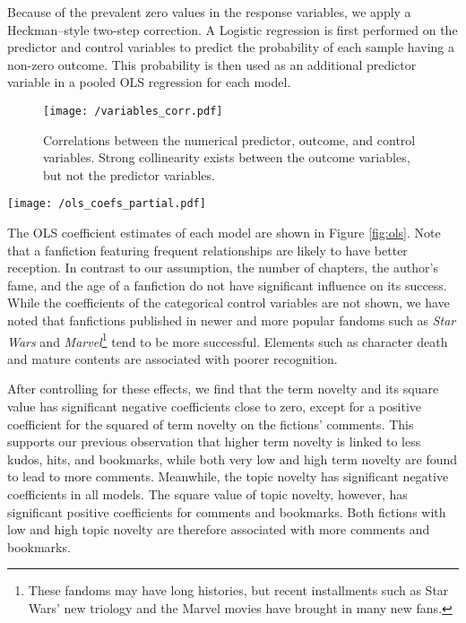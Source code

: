 \documentclass[letterpaper]{article} %
\begin{document}
Because of the prevalent zero values in the response variables, we apply a Heckman--style two-step correction. A Logistic regression is first performed on the predictor and control variables to predict the probability of each sample having a non-zero outcome. This probability is then used as an additional predictor variable in a pooled OLS regression for each model.

\begin{figure}
    \centering
          \texttt{[image: /variables\_corr.pdf]}
        \caption{Correlations between the numerical predictor, outcome, and control variables. Strong collinearity exists between the outcome variables, but not the predictor variables. }
        \label{fig:corr}
\end{figure}

\begin{figure*}
    \centering
          \texttt{[image: /ols\_coefs\_partial.pdf]}
        \caption{OLS coefficients for the independent variables and selected control variables. 95\% confidence intervals are shown. The coefficients of the categorical variables are omitted.}
        \label{fig:ols}
\end{figure*}

The OLS coefficient estimates of each model are shown in Figure \ref{fig:ols}. Note that a fanfiction featuring frequent relationships are likely to have better reception. In contrast to our assumption, the number of chapters, the author's fame, and the age of a fanfiction do not have significant influence on its success. While the coefficients of the categorical control variables are not shown, we have noted that fanfictions published in newer and more popular fandoms such as \emph{Star Wars} and \emph{Marvel}\footnote{These fandoms may have long histories, but recent installments such as Star Wars' new triology and the Marvel movies have brought in many new fans.} tend to be more successful. Elements such as character death and mature contents are associated with poorer recognition. 

After controlling for these effects, we find that the term novelty and its square value has significant negative coefficients close to zero, except for a positive coefficient for the squared of term novelty on the fictions' comments. This supports our previous observation that higher term novelty is linked to less kudos, hits, and bookmarks, while both very low and high term novelty are found to lead to more comments. Meanwhile, the topic novelty has significant negative coefficients in all models. The square value of topic novelty, however, has significant positive coefficients for comments and bookmarks. Both fictions with low and high topic novelty are therefore associated with more comments and bookmarks. 
\end{document}

